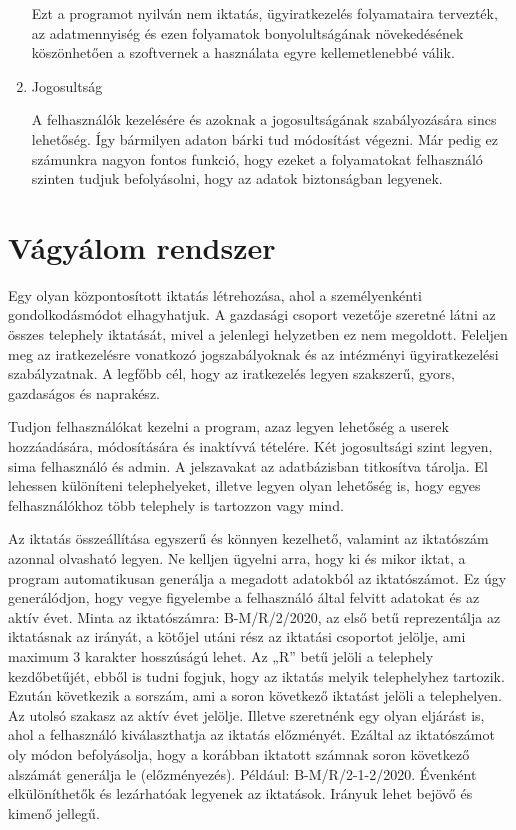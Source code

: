 \documentclass[
]{thesis-ekf}
\theoremstyle{definition}
\theoremstyle{remark}
\begin{document}
\begin{enumerate}[leftmargin=0pt]
Ezt a programot nyilván nem iktatás, ügyiratkezelés folyamataira tervezték, az adatmennyiség  és ezen folyamatok bonyolultságának  növekedésének köszönhetően a szoftvernek a használata egyre kellemetlenebbé válik. 
	\item Jogosultság

A felhasználók kezelésére és azoknak a jogosultságának szabályozására sincs lehetőség. Így bármilyen adaton bárki tud módosítást végezni. Már pedig ez számunkra nagyon fontos funkció, hogy ezeket a folyamatokat felhasználó szinten tudjuk befolyásolni, hogy az adatok biztonságban legyenek. 

\end{enumerate}

\section{Vágyálom rendszer}
Egy olyan központosított iktatás létrehozása, ahol a személyenkénti gondolkodásmódot elhagyhatjuk. A gazdasági csoport vezetője szeretné látni az összes telephely iktatását, mivel a jelenlegi helyzetben ez nem megoldott. Feleljen meg az iratkezelésre vonatkozó jogszabályoknak és az intézményi ügyiratkezelési szabályzatnak. A legfőbb cél, hogy az iratkezelés legyen szakszerű, gyors, gazdaságos és naprakész.

Tudjon felhasználókat kezelni a program, azaz legyen lehetőség a userek hozzáadására, módosítására és inaktívvá tételére. Két jogosultsági szint legyen, sima felhasználó és admin. A jelszavakat az adatbázisban titkosítva tárolja. El lehessen különíteni telephelyeket, illetve legyen olyan lehetőség is, hogy egyes felhasználókhoz több telephely is tartozzon vagy mind.

Az iktatás összeállítása egyszerű és könnyen kezelhető, valamint az iktatószám azonnal olvasható legyen. Ne kelljen ügyelni arra, hogy ki és mikor iktat, a program automatikusan generálja a megadott adatokból az iktatószámot. Ez úgy generálódjon, hogy vegye figyelembe a felhasználó által felvitt adatokat és az aktív évet. Minta az iktatószámra: B-M/R/2/2020, az első betű reprezentálja az iktatásnak az irányát, a kötőjel utáni rész az iktatási csoportot jelölje, ami maximum 3 karakter hosszúságú lehet.  Az „R” betű jelöli a telephely kezdőbetűjét, ebből is tudni fogjuk, hogy az iktatás melyik telephelyhez tartozik. Ezután következik a sorszám, ami a soron következő iktatást jelöli a telephelyen. Az utolsó szakasz az aktív évet jelölje. Illetve szeretnénk egy olyan eljárást is, ahol a felhasználó kiválaszthatja az iktatás előzményét. Ezáltal az iktatószámot oly módon befolyásolja, hogy a korábban iktatott számnak soron következő alszámát generálja le (előzményezés). Például: B-M/R/2-1-2/2020. Évenként elkülöníthetők és lezárhatóak legyenek az iktatások. Irányuk lehet bejövő és kimenő jellegű.
\end{document}
